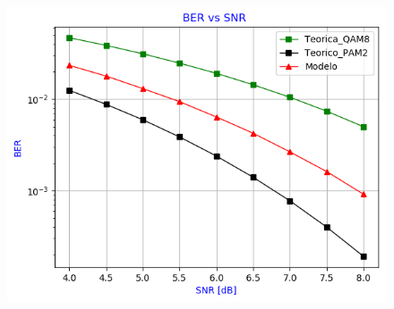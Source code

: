 \begin{frame}
\begin{columns}
    \begin{column}{0.48\paperwidth} 
        \begin{figure}
          \centering
          \includegraphics[width=\textwidth]{Graficos/BER_vs_SNR_8.png}%
        \end{figure}
        \end{column}
    \end{columns}

\end{frame}

  
 


